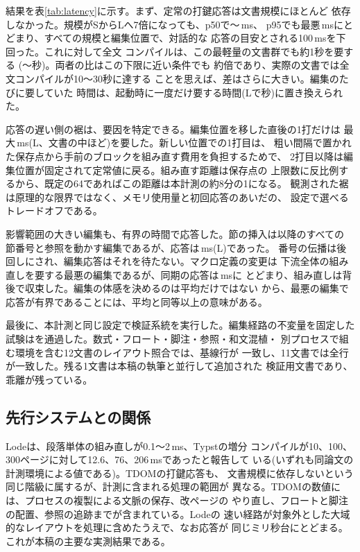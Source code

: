 \documentclass[a4paper,11pt]{ltjsarticle}
\newcommand{\tdom}{TDOM}
\begin{document}
結果を表\ref{tab:latency}に示す。まず、定常の打鍵応答は文書規模にほとんど
依存しなかった。規模がSからLへ7倍になっても、p50で\nStypP〜\nLtypP\,ms、
p95でも最悪\nWorstPP\,msにとどまり、すべての規模と編集位置で、対話的な
応答の目安とされる100\,ms\cite{card1983}を下回った。これに対して全文
コンパイルは、この最軽量の文書群でも約1秒を要する
(\nScoldSec〜\nLcoldSec 秒)。両者の比はこの下限に近い条件でも
約\nSpeedup 倍であり、実際の文書では全文コンパイルが10〜30秒に達する
\cite{lode2026}ことを思えば、差はさらに大きい。編集のたびに要していた
時間は、起動時に一度だけ要する時間(Lで\nLbootSec 秒)に置き換えられた。

応答の遅い側の裾は、要因を特定できる。編集位置を移した直後の1打だけは
最大\nLfirst\,ms(L、文書の中ほど)を要した。新しい位置での1打目は、
粗い間隔で置かれた保存点から手前のブロックを組み直す費用を負担するためで、
2打目以降は編集位置が固定されて定常値に戻る。組み直す距離は保存点の
上限数に反比例するから、既定の64であればこの距離は本計測の約8分の1になる。
観測された裾は原理的な限界ではなく、メモリ使用量と初回応答のあいだの、
設定で選べるトレードオフである。

影響範囲の大きい編集も、有界の時間で応答した。節の挿入は以降のすべての
節番号と参照を動かす編集であるが、応答は\nLsecIns\,ms(L)であった。
番号の伝播は後回しにされ、編集応答はそれを待たない。マクロ定義の変更は
下流全体の組み直しを要する最悪の編集であるが、同期の応答は\nLdefEd\,msに
とどまり、組み直しは背後で収束した。編集の体感を決めるのは平均だけではない
から、最悪の編集で応答が有界であることには、平均と同等以上の意味がある。

最後に、本計測と同じ設定で検証系統を実行した。編集経路の不変量を固定した
試験は\nHotpath を通過した。数式・フロート・脚注・参照・和文混植・
別プロセスで組む環境を含む12文書のレイアウト照合では、基線\nFarmLines 行が
一致し、11文書では全行が一致した。残る1文書は本稿の執筆と並行して追加された
検証用文書であり、乖離が残っている。

\subsection{先行システムとの関係}

Lode\cite{lode2026}は、段落単体の組み直しが0.1〜2\,ms、Typstの増分
コンパイルが10、100、300ページに対して12.6、76、206\,msであったと報告して
いる(いずれも同論文の計測環境による値である)。\tdom{}の打鍵応答も、
文書規模に依存しないという同じ階級に属するが、計測に含まれる処理の範囲が
異なる。\tdom{}の数値には、プロセスの複製による文脈の保存、改ページの
やり直し、フロートと脚注の配置、参照の追跡までが含まれている。Lodeの
速い経路が対象外とした大域的なレイアウトを処理に含めたうえで、なお応答が
同じミリ秒台にとどまる。これが本稿の主要な実測結果である。
\end{document}
